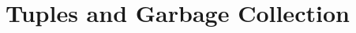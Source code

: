 \documentclass[11pt]{book}
\begin{document}



\chapter{Tuples and Garbage Collection}
\label{ch:tuples}
\end{document}
